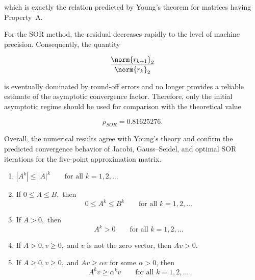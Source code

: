 \documentclass{ctexart}
\begin{document}
\begin{solution}
\begin{enumerate}
      which is exactly the relation predicted by Young's theorem for matrices
      having Property~A.

      For the SOR method, the residual decreases rapidly to the level of
      machine precision. Consequently, the quantity

      \[
        \frac{\norm{r_{k+1}}_2}{\norm{r_k}_2}
      \]

      is eventually dominated by round-off errors and no longer provides a
      reliable estimate of the asymptotic convergence factor. Therefore, only
      the initial asymptotic regime should be used for comparison with the
      theoretical value

      \[
        \rho_{SOR}
        =
        0.81625276.
      \]

      Overall, the numerical results agree with Young's theory and confirm the
      predicted convergence behavior of Jacobi, Gauss--Seidel, and optimal
      SOR iterations for the five-point approximation matrix.
  \end{enumerate}

\end{solution}
\begin{problem}\label{pro:7}
  \begin{enumerate}
    \item
      \(
        |A^k| \le |A|^k
        \qquad \text{for all } k=1,2,\ldots
      \)

    \item
      If
      \(
        0 \le A \le B,
      \)
      then
      \[
        0 \le A^k \le B^k
        \qquad \text{for all } k=1,2,\ldots
      \]

    \item
      If
      \(
        A>0,
      \)
      then
      \[
        A^k>0
        \qquad \text{for all } k=1,2,\ldots
      \]

    \item
      If
      \(
        A>0,v\ge 0,
      \)
      and \(v\) is not the zero vector, then
      \(
        Av>0.
      \)

    \item
      If
      \(
        A\ge 0, v\ge 0,
      \)
      and
      \(
        Av\ge \alpha v
      \)
      for some \(\alpha>0\), then
      \[
        A^k v \ge \alpha^k v
        \qquad \text{for all } k=1,2,\ldots
      \]
  \end{enumerate}
\end{problem}
\end{document}
